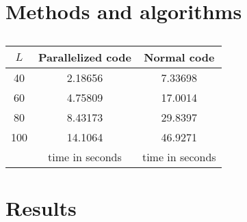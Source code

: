 \documentclass[%
preprint,
 amsmath,amssymb,
 aps,
]{revtex4-1}
\theoremstyle{plain}
\theoremstyle{definition}
\theoremstyle{plain}
\begin{document}
\section{Methods and algorithms}

\begin{table}[h!]
\centering
\setlength{\tabcolsep}{12pt}
\caption{}
\label{time}
\begin{tabular}{ccc}
\toprule
$L$ &  Parallelized code & Normal code \\
\midrule
  40	    &   2.18656 & 7.33698 \\
  60	     &  4.75809 & 17.0014 \\
  80	     &  8.43173 & 29.8397 \\
  100	 &  14.1064 & 46.9271 \\
\bottomrule
 & time in seconds & time in seconds
\end{tabular}

\end{table}



\section{Results}
\end{document}
